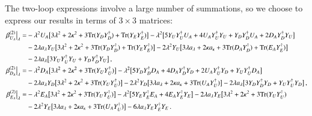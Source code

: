 \documentclass[final,3p,times,pdflatex]{elsarticle}
\newcommand{\lamsq}{\lambda^2}
\newcommand{\kapsq}{\kappa^2}
\newcommand{\tr}{\mathrm{Tr}}
\begin{document}
The two-loop expressions involve a large number of summations, so we choose to 
express our results in terms of $3\times 3$ matrices:
%
\begin{align}
\left.\beta_{ U_A}^{(2)}\right|_\lambda =& -\lamsq U_A\big[ 3\lamsq + 2\kapsq 
+ 3\tr( Y_D Y_D^\dagger) + \tr( Y_E Y_E^\dagger) \big] 
-\lamsq\big[ 5 Y_U Y_U^\dagger U_A + 4 U_A Y_U^\dagger Y_U +  Y_D Y_D^\dagger U_A 
+ 2 D_A Y_D^\dagger Y_U \big] \notag \\
%
&-2\lambda  a_\lambda Y_U\big[ 3\lamsq + 2\kapsq + 3\tr( Y_D Y_D^\dagger) 
+ \tr( Y_E Y_E^\dagger) \big] -2\lamsq Y_U\big[ 3\lambda  a_\lambda 
+ 2\kappa a_\kappa + 3\tr( D_A Y_D^\dagger) + \tr( E_A Y_E^\dagger) \big] \notag \\
%
&-2\lambda  a_\lambda\big[ 3 Y_U Y_U^\dagger Y_U +  Y_D Y_D^\dagger Y_U \big]\,, \\
%
%
\left.\beta_{ D_A}^{(2)}\right|_\lambda =& -\lamsq D_A\big[ 3\lamsq + 2\kapsq 
+ 3\tr( Y_U Y_U^\dagger) \big] 
-\lamsq\big[ 5 Y_D Y_D^\dagger D_A + 4 D_A Y_D^\dagger Y_D + 2 U_A Y_U^\dagger Y_D 
+  Y_U Y_U^\dagger D_A \big] \notag \\
%
&-2\lambda  a_\lambda  Y_D\big[ 3\lamsq + 2\kapsq + 3\tr( Y_U Y_U^\dagger) \big]
-2\lamsq Y_D\big[ 3\lambda  a_\lambda + 2\kappa a_\kappa 
+ 3\tr( U_A Y_U^\dagger) \big] -2\lambda  a_\lambda\big[ 3 Y_D Y_D^\dagger Y_D 
+  Y_U Y_U^\dagger Y_D\big]\,,  \\
%
%
\left.\beta_{ E_A}^{(2)}\right|_\lambda =& -\lamsq  E_A\big[ 3\lamsq + 2\kapsq 
+ 3\tr( Y_U Y_U^\dagger) \big] 
-\lamsq\big[ 5 Y_E Y_E^\dagger E_A + 4 E_A Y_E^\dagger Y_E \big] 
-2\lambda  a_\lambda  Y_E\big[ 3\lamsq + 2\kapsq + 3\tr( Y_U Y_U^\dagger) \notag \\
%
&-2\lamsq Y_E\big[ 3\lambda a_\lambda + 2\kappa a_\kappa + 3\tr( U_A Y_U^\dagger) 
\big] -6\lambda a_\lambda  Y_E Y_E^\dagger Y_E\,.
\end{align}
\end{document}
